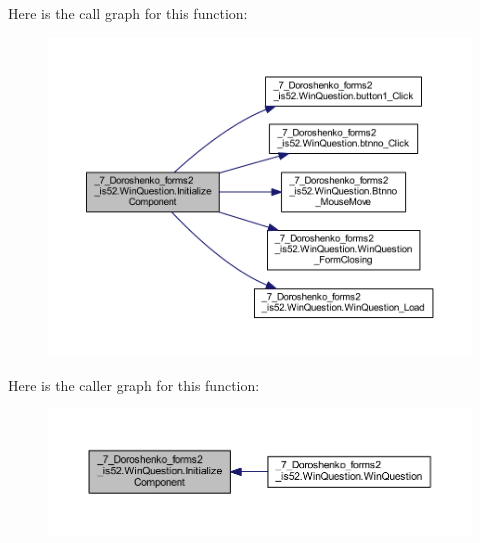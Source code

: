 Here is the call graph for this function\+:
\nopagebreak
\begin{figure}[H]
\begin{center}
\leavevmode
\includegraphics[width=350pt]{class__7___doroshenko__forms2__is52_1_1_win_question_aaec60c526c71252de0eb231ee16a876c_cgraph}
\end{center}
\end{figure}
Here is the caller graph for this function\+:
\nopagebreak
\begin{figure}[H]
\begin{center}
\leavevmode
\includegraphics[width=350pt]{class__7___doroshenko__forms2__is52_1_1_win_question_aaec60c526c71252de0eb231ee16a876c_icgraph}
\end{center}
\end{figure}
\hypertarget{class__7___doroshenko__forms2__is52_1_1_win_question_ace95f250fa359610e86f5fedd278e67e}{}\label{class__7___doroshenko__forms2__is52_1_1_win_question_ace95f250fa359610e86f5fedd278e67e} 
